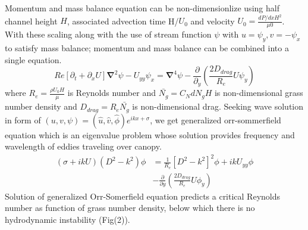 \documentclass[aps,twocolumn,floatfix,prl,10pt]{revtex4-1}
\newcommand{\grad}{\mathbf{\nabla}}
\newcommand{\del}{\partial}
\begin{document}
Momentum and mass balance equation can be non-dimensionlize using half channel height $H$, associated advection time H/$U_0$ and velocity $U_0 = \frac{dP/dxH^2}{\mu0}$.
With these scaling along with the use of stream function $\psi$ with $u = \psi_{y}, v= -\psi_x$ to satisfy mass balance; momentum and mass balance can be combined 
into a single equation.
\begin{equation}
\scriptstyle{
Re\left[\del_t+\del_x U \right]\grad^2\psi - U_{yy}\psi_x = \grad^4\psi-\frac{\del}{\del_y}\left(\frac{2D_{drag}}{R_e}U\psi_y\right)
}
\end{equation}
where $R_{e}= \frac{\rho U_0 H}{\mu}$ is Reynolds number and $\bar{N_g} = C_N d N_g H$ is non-dimensional grass number density and  $D_{drag} = R_{e}\bar{N_{g}}$ is 
non-dimensional drag. Seeking wave solution in form of $\left(u,v,\psi \right)= \left(\hat u, \hat v, \hat\phi \right)e^{ikx+\sigma}$, we get generalized orr-sommerfield equation 
which is an eigenvalue problem whose solution provides frequency and wavelength of eddies traveling over canopy.
\begin{equation}
\begin{split}
\left(\sigma+ikU\right) \left(D^2-k^2\right)\phi &= \frac{1}{R_{e}}\left[D^2 -k^{2} \right]^2\phi +ikU_{yy}\phi \\
&-\frac{\del}{\del y}\left(\frac{2D_{drag}}{R_e}U\phi_y\right)
\end{split}
\end{equation}
Solution of generalized Orr-Somerfield equation predicts a critical Reynolds number as function of grass number density, below which there is no hydrodynamic instability (Fig(2)).
\end{document}
